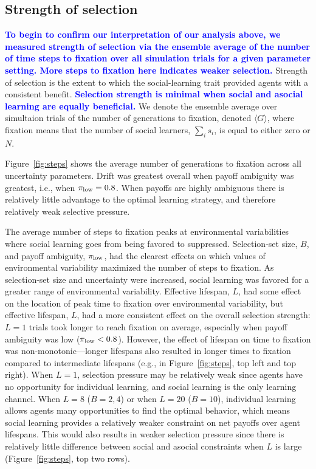 \documentclass[letterpaper,11.5pt]{scrartcl}
\newcommand{\edit}[1]{{\bfseries \textcolor{blue} {#1}}}
\begin{document}
\subsection{Strength of selection}

\edit{To begin to confirm our interpretation of our analysis above, we measured
  strength of selection via the ensemble average of the number of
time steps to fixation over all simulation trials for a given parameter setting. More steps to fixation here indicates weaker selection.} Strength of selection is the extent to which the
social-learning trait provided agents with a consistent benefit. \edit{Selection
  strength is minimal when social and asocial learning
are equally beneficial.} 
We denote the ensemble average over simultaion trials of the number of generations to fixation, denoted $\langle G \rangle$, where fixation means that the number of social learners, $\sum_i s_i$, is equal to either zero or $N$. %

Figure~\ref{fig:steps} shows the average number of generations to fixation across all uncertainty parameters. Drift was greatest overall when payoff ambiguity was greatest, i.e., when $\pi_{\mathrm{low}} = 0.8$. When payoffs are highly ambiguous there is relatively little advantage to the optimal learning strategy, and therefore relatively weak selective pressure.

The average number of steps to fixation peaks at environmental variabilities 
where social learning goes from being favored to suppressed. 
Selection-set size, $B$, 
and payoff ambiguity, $\pi_{\mathrm{low}}$, 
had the clearest effects on which values of environmental variability maximized
the number of steps to fixation. As selection-set size and uncertainty were increased, 
social learning was favored for a greater range of environmental variability. 
Effective lifespan, $L$, 
had some effect on the location of peak time to fixation over environmental variability, 
but effective lifespan, $L$, had a more consistent effect on the
overall selection strength: $L=1$ trials took longer to reach fixation on average, 
especially when payoff ambiguity 
was low ($\pi_{\mathrm{low}} < 0.8$). However, the effect of lifespan on time to fixation was non-monotonic---longer
lifespans also resulted in longer times to fixation compared to intermediate lifespans (e.g., in
Figure~\ref{fig:steps}, top left and top right). When $L=1$, selection pressure may be relatively
weak since agents have no opportunity for individual learning, and social learning is the only
learning channel. When $L=8$ ($B=2,4$) or when $L=20$ ($B=10$), individual learning allows agents
many opportunities to find the optimal behavior, which means social learning provides a relatively
weaker constraint on net payoffs over agent lifespans. This would also results in weaker selection pressure since there is relatively little difference between social and asocial constraints when $L$ is large
(Figure~\ref{fig:steps}, top two rows).
\end{document}
